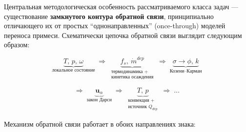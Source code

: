\documentclass[11pt]{extarticle}
\begin{document}
Центральная методологическая особенность рассматриваемого класса задач --- существование \textbf{замкнутого контура обратной связи}, принципиально отличающего их от простых ``однонаправленных'' (once-through) моделей переноса примеси. Схематически цепочка обратной связи выглядит следующим образом:

\[
\underbrace{T,\,p,\,\omega}_{\text{локальное состояние}} \;\Rightarrow\; \underbrace{f_s,\ \dot m^{dep}}_{\substack{\text{термодинамика +}\\ \text{кинетика осаждения}}} \;\Rightarrow\; \underbrace{\sigma \to \phi,\, k}_{\text{Козени–Карман}}
\]

\[
\Rightarrow\; \underbrace{\mathbf{u}_\alpha}_{\text{закон Дарси}} \;\Rightarrow\; \underbrace{T,\,p}_{\substack{\text{конвекция +}\\ \text{источник } Q_{dep}}} \;\Rightarrow\; \ldots
\]

Механизм обратной связи работает в обоих направлениях знака:
\end{document}
